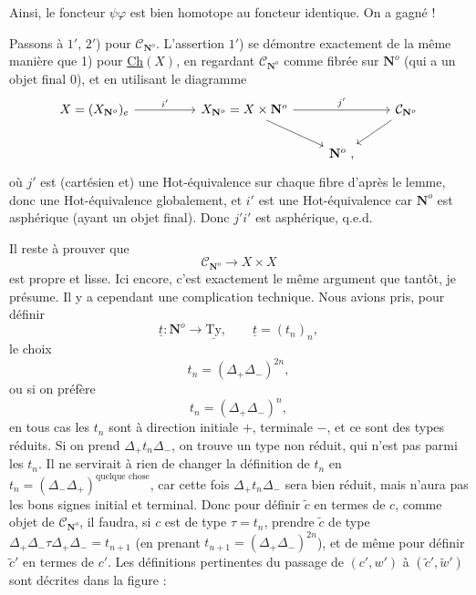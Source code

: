 \documentclass[11pt]{article}
\newcommand{\printedpage}[1]{\marginpar{\footnotesize p.~#1}}
\newcommand{\msp}[1]{\marginpar{\footnotesize [#1]}}
\newcommand{\CN}{\mathcal{C}_{\mathbf{N}^o}}
\begin{document}
\printedpage{104}
\msp{page 166}

Ainsi, le foncteur $\psi\varphi$ est bien homotope au foncteur identique. On a gagné !

Passons à $1'$, $2'$) pour $\CN$. L'assertion $1'$) se démontre exactement de la même manière que 1) pour \underline{Ch}$(X)$, en regardant $\CN$ comme fibrée sur $\mathbf{N}^o$ (qui a un objet final 0), et en utilisant le diagramme
\[
\begin{tikzcd}
X = (X_{\mathbf{N}^o})_e \arrow[rr, "i'"] & & X_{\mathbf{N}^o} = X \times \mathbf{N}^o \arrow[rr, "j'"] \arrow[dr] & & \mathcal{C}_{\mathbf{N}^o} \arrow[dl] \\
 & & & \mathbf{N}^o \ , &
\end{tikzcd}
\]
où $j'$ est (cartésien et) une Hot-équivalence sur chaque fibre d'après le lemme, donc une Hot-équivalence globalement, et $i'$ est une Hot-équivalence car $\mathbf{N}^o$ est asphérique (ayant un objet final). Donc $j'i'$ est asphérique, q.e.d.

Il reste à prouver que
\[ \CN \longrightarrow X \times X \]
est propre et lisse. Ici encore,
\msp{page 167}
c'est exactement le même argument que tantôt, je présume. Il y a cependant une complication technique. Nous avions pris, pour définir
\[ \underline{t} : \mathbf{N}^o \longrightarrow \underline{\mathrm{Ty}}, \qquad \underline{t} = (t_n)_n, \]
le choix
\[ t_n = (\Delta_+\Delta_-)^{2n}, \]
ou si on préfère
\[ t_n = (\Delta_+\Delta_-)^n, \]
en tous cas les $t_n$ sont à direction initiale $+$, terminale $-$, et ce sont des types réduits. Si on prend $\Delta_+t_n\Delta_-$, on trouve un type non réduit, qui n'est pas parmi les $t_n$. Il ne servirait à rien de changer la définition de $t_n$ en $t_n = (\Delta_-\Delta_+)^{\text{quelque chose}}$, car cette fois $\Delta_+t_n\Delta_-$ sera bien réduit, mais n'aura pas les bons signes initial et terminal. Donc pour définir $\tilde{c}$ en termes de $c$, comme objet de $\CN$, il faudra, si $c$ est de type $\tau = t_n$, prendre $\tilde{c}$ de type $\Delta_+\Delta_-\tau\Delta_+\Delta_- = t_{n+1}$ (en prenant $t_{n+1} = (\Delta_+\Delta_-)^{2n}$), et de même pour définir $\tilde{c}'$ en termes de $c'$. Les définitions pertinentes du passage de $(c',w')$ à $(\tilde{c}',\tilde{w}')$ sont décrites dans la figure : %

\msp{page 168}
\end{document}
